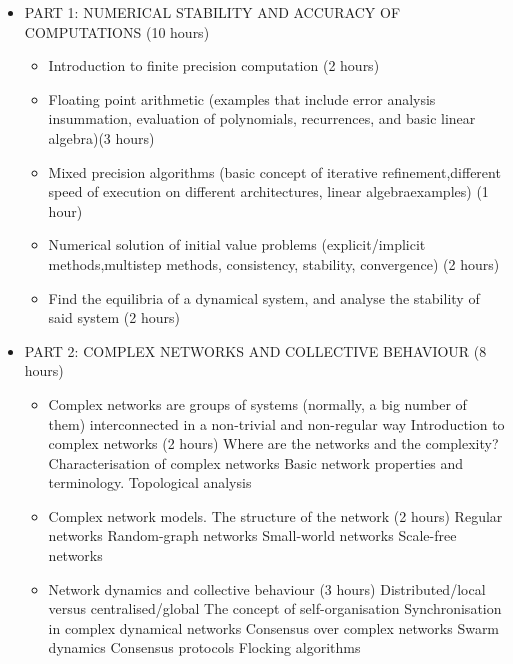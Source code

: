 \begin{mymulticols}
    \begin{itemize}
    \item PART 1: NUMERICAL STABILITY AND ACCURACY OF COMPUTATIONS (10 hours)
      \begin{itemize}
        \item Introduction to finite precision computation (2 hours)
        \item Floating point arithmetic (examples that include error analysis insummation, evaluation of polynomials, recurrences, and basic linear algebra)(3 hours)
        \item Mixed precision algorithms (basic concept of iterative refinement,different speed of execution on different architectures, linear algebraexamples) (1 hour)
        \item Numerical solution of initial value problems (explicit/implicit methods,multistep methods, consistency, stability, convergence) (2 hours)
        \item Find the equilibria of a dynamical system, and analyse the stability of said system (2 hours) \\ \newline
      \end{itemize}

  \item PART 2: COMPLEX NETWORKS AND COLLECTIVE BEHAVIOUR (8 hours)
    \begin{itemize}
      \item Complex networks are groups of systems (normally, a big number of them) interconnected in a non-trivial and non-regular way
Introduction to complex networks (2 hours)
	Where are the networks and the complexity?
	Characterisation of complex networks
	Basic network properties and terminology. Topological analysis
      \item Complex network models. The structure of the network (2 hours)
	Regular networks
	Random-graph networks
	Small-world networks
	Scale-free networks
      \item Network dynamics and collective behaviour (3 hours)
	Distributed/local versus centralised/global
	The concept of self-organisation
	Synchronisation in complex dynamical networks
	Consensus over complex networks
	Swarm dynamics
	Consensus protocols
	Flocking algorithms
        \end{itemize}
  \end{itemize}
\end{mymulticols}

